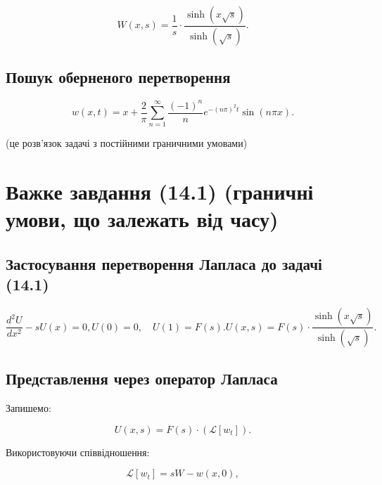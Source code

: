 \documentclass[
  ukrainian,
]{article}
\begin{document}
\[
W(x, s) = \frac{1}{s} \cdot \frac{\sinh(x \sqrt{s})}{\sinh(\sqrt{s})}.
\]

\subsection{Пошук оберненого
перетворення}\label{ux43fux43eux448ux443ux43a-ux43eux431ux435ux440ux43dux435ux43dux43eux433ux43e-ux43fux435ux440ux435ux442ux432ux43eux440ux435ux43dux43dux44f}

\[
w(x, t) = x + \frac{2}{\pi} \sum_{n=1}^{\infty} \frac{(-1)^n}{n} e^{-(n\pi)^2 t} \sin(n\pi x).
\]

(це розв'язок задачі з постійними граничними умовами)

\section{Важке завдання (14.1) (граничні умови, що залежать від
часу)}\label{ux432ux430ux436ux43aux435-ux437ux430ux432ux434ux430ux43dux43dux44f-14.1-ux433ux440ux430ux43dux438ux447ux43dux456-ux443ux43cux43eux432ux438-ux449ux43e-ux437ux430ux43bux435ux436ux430ux442ux44c-ux432ux456ux434-ux447ux430ux441ux443}

\subsection{Застосування перетворення Лапласа до задачі
(14.1)}\label{ux437ux430ux441ux442ux43eux441ux443ux432ux430ux43dux43dux44f-ux43fux435ux440ux435ux442ux432ux43eux440ux435ux43dux43dux44f-ux43bux430ux43fux43bux430ux441ux430-ux434ux43e-ux437ux430ux434ux430ux447ux456-14.1}

\[
\frac{d^2 U}{dx^2} - s U(x) = 0,
U(0) = 0, \quad U(1) = F(s).
U(x, s) = F(s)\cdot \frac{\sinh(x \sqrt{s})}{\sinh(\sqrt{s})}.
\]

\subsection{Представлення через оператор
Лапласа}\label{ux43fux440ux435ux434ux441ux442ux430ux432ux43bux435ux43dux43dux44f-ux447ux435ux440ux435ux437-ux43eux43fux435ux440ux430ux442ux43eux440-ux43bux430ux43fux43bux430ux441ux430}

Запишемо:

\[
U(x, s) = F(s) \cdot \left( \mathcal{L}[w_t] \right).
\]

Використовуючи співвідношення:

\[
\mathcal{L}[w_t] = s W - w(x, 0),
\]
\end{document}
